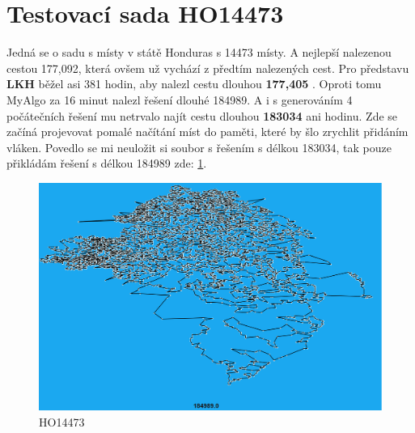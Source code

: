 \section{Testovací sada HO14473}
Jedná se o sadu s místy v státě Honduras s 14473 místy. A nejlepší nalezenou cestou 177,092, která ovšem už vychází z předtím nalezených cest. Pro představu \textbf{LKH} běžel asi 381 hodin, aby nalezl cestu dlouhou \textbf{177,405} \cite{HO14473}. Oproti tomu MyAlgo za 16 minut nalezl řešení dlouhé 184989. A i s generováním 4 počátečních řešení mu netrvalo najít cestu dlouhou \textbf{183034} ani hodinu. Zde se začíná projevovat pomalé načítání míst do paměti, které by šlo zrychlit přidáním vláken.  Povedlo se mi neuložit si soubor s řešením s délkou 183034, tak pouze přikládám řešení s délkou 184989 zde: \ref{fig:HO14473}.



\begin{table}[H]
\caption{HO14473}
\centering
{}
\end{table}

\begin{figure}[H]
    \centering
    \includegraphics[width=15cm]{obrazky-figures/HO14473.png}
    \caption{HO14473}
    \label{fig:HO14473}
\end{figure}



